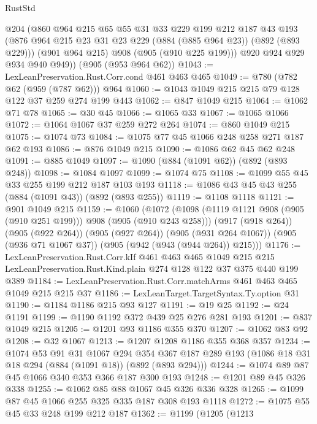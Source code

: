 \begin{lexlean}{RustStd}
\begin{coremodule}
{\begin{coremodule}
{{{{{        @204
        (@860
          @964
          @215
          @65
          @55
          @31
          @33
          @229
          @199
          @212
          @187
          @43
          @193
          (@876 @964 @215 @23 @31 @23 @229 (@884 (@885 @964 @23)) (@892 (@893 @229)))
          (@901 @964 @215)
          @908
          (@905 (@910 @225 @199)))
        @920
        @924
        @929
        @934
        @940
        @949))
    (@905 (@953 @964 @62))
@1043 := LexLeanPreservation.Rust.Corr.cond @461 @463 @465
@1049 := @780 (@782 @62 (@959 (@787 @62))) @964
@1060 := @1043 @1049 @215 @215 @79 @128 @122 @37 @259 @274 @199 @443
@1062 := @847 @1049 @215
@1064 := @1062 @71 @78
@1065 := @30 @45
@1066 := @1065 @33
@1067 := @1065 @1066
@1072 := @1064 @1067 @37 @259 @272 @264
@1074 := @860 @1049 @215
@1075 := @1074 @73
@1084 := @1075 @77 @45 @1066 @248 @258 @271 @187 @62 @193
@1086 := @876 @1049 @215
@1090 := @1086 @62 @45 @62 @248
@1091 := @885 @1049
@1097 := @1090 (@884 (@1091 @62)) (@892 (@893 @248))
@1098 := @1084 @1097
@1099 := @1074 @75
@1108 := @1099 @55 @45 @33 @255 @199 @212 @187 @103 @193
@1118 := @1086 @43 @45 @43 @255 (@884 (@1091 @43)) (@892 (@893 @255))
@1119 := @1108 @1118
@1121 := @901 @1049 @215
@1159 := @1060
    (@1072
      (@1098 (@1119 @1121 @908 (@905 (@910 @251 @199))) @908 (@905 (@910 @243 @258)))
      (@917 (@918 @264))
      (@905 (@922 @264))
      (@905 (@927 @264))
      (@905 (@931 @264 @1067))
      (@905 (@936 @71 @1067 @37))
      (@905 (@942 (@943 (@944 @264)) @215)))
@1176 := LexLeanPreservation.Rust.Corr.kIf
    @461
    @463
    @465
    @1049
    @215
    @215
    LexLeanPreservation.Rust.Kind.plain
    @274
    @128
    @122
    @37
    @375
    @440
    @199
    @389
@1184 := LexLeanPreservation.Rust.Corr.matchArms @461 @463 @465 @1049 @215 @215 @37
@1186 := LexLeanTarget.TargetSyntax.Ty.option @31
@1190 := @1184 @1186 @215 @93 @127
@1191 := @19 @25
@1192 := @24 @1191
@1199 := @1190 @1192 @372 @439 @25 @276 @281 @193
@1201 := @837 @1049 @215
@1205 := @1201 @93 @1186 @355 @370
@1207 := @1062 @83 @92
@1208 := @32 @1067
@1213 := @1207 @1208 @1186 @355 @368 @357
@1234 := @1074
    @53
    @91
    @31
    @1067
    @294
    @354
    @367
    @187
    @289
    @193
    (@1086 @18 @31 @18 @294 (@884 (@1091 @18)) (@892 (@893 @294)))
@1244 := @1074 @89 @87 @45 @1066 @340 @353 @366 @187 @300 @193
@1248 := @1201 @89 @45 @326 @338
@1255 := @1062 @85 @88 @1067 @45 @326 @336 @328
@1265 := @1099 @87 @45 @1066 @255 @325 @335 @187 @308 @193 @1118
@1272 := @1075 @55 @45 @33 @248 @199 @212 @187
@1362 := @1199
    (@1205
      (@1213
}}}}}
\end{coremodule}}
\end{coremodule}
\end{lexlean}
